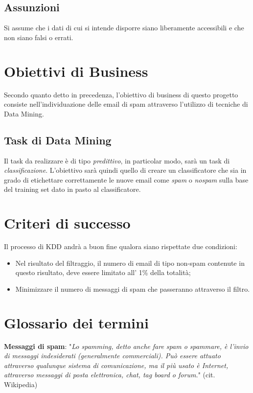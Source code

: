 \subsection{Assunzioni}
	Si assume che i dati di cui si intende disporre siano liberamente accessibili e che non siano falsi o errati.

\section{Obiettivi di Business}
	Secondo quanto detto in precedenza, l'obiettivo di business di questo progetto consiste nell'individuazione delle email di spam attraverso l'utilizzo di tecniche di Data Mining.

\subsection{Task di Data Mining}
	Il task da realizzare è di tipo \textit{predittivo}, in particolar modo, sarà un task di \textit{classificazione}. L'obiettivo sarà quindi quello di creare un classificatore che sia in grado di etichettare correttamente le nuove email come \textit{spam} o \textit{nospam} sulla base del training set dato in pasto al classificatore. 

\section{Criteri di successo}
	Il processo di KDD andrà a buon fine qualora siano rispettate due condizioni:
	\begin{itemize}
		\item 	Nel risultato del filtraggio, il numero di email di tipo non-spam contenute in questo risultato, deve essere limitato 	all' 1\% della totalità;
		\item	Minimizzare il numero di messaggi di spam che passeranno attraverso il filtro.
	\end{itemize}

\section{Glossario dei termini}
\textbf{Messaggi di spam}: "\textit{Lo spamming, detto anche fare spam o spammare, è l'invio di messaggi indesiderati (generalmente commerciali). Può essere attuato attraverso qualunque sistema di comunicazione, ma il più usato è Internet, attraverso messaggi di posta elettronica, chat, tag board o forum.}" (cit. Wikipedia)\cite{wiki:Spam}


